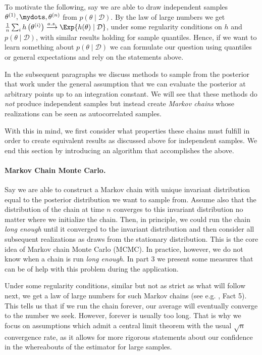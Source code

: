 To motivate the following, say we are able to draw independent samples $\theta^{(1)}, \mydots, \theta^{(n)}$ from $p(\theta \mid \mathcal{D})$.
By the law of large numbers we get $\frac{1}{n} \sum_i h\left(\theta^{(i)}\right) \overset{a.s.}{\longrightarrow} \Exp{h(\theta) \mid \mathcal{D}}$, under some regularity conditions on $h$ and $p(\theta \mid \mathcal{D})$, with similar results holding for sample quantiles.
Hence, if we want to learn something about $p(\theta \mid \mathcal{D})$ we can formulate our question using quantiles or general expectations and rely on the statements above.

In the subsequent paragraphs we discuss methods to sample from the posterior that work under the general assumption that we can evaluate the posterior at arbitrary points up to an integration constant.
We will see that these methods do \emph{not} produce independent samples but instead create \emph{Markov chains} whose realizations can be seen as autocorrelated samples.

With this in mind, we first consider what properties these chains must fulfill in order to create equivalent results as discussed above for independent samples.
We end this section by introducing an algorithm that accomplishes the above.

\paragraph{Markov Chain Monte Carlo.}
Say we are able to construct a Markov chain with unique invariant distribution equal to the posterior distribution we want to sample from.
Assume also that the distribution of the chain at time $n$ converges to this invariant distribution no matter where we initialize the chain.
Then, in principle, we could run the chain \emph{long enough} until it converged to the invariant distribution and then consider all subsequent realizations as draws from the stationary distribution.
This is the core idea of Markov chain Monte Carlo (MCMC).
In practice, however, we do not know when a chain is run \emph{long enough}.
In part 3 we present some measures that can be of help with this problem during the application.

Under some regularity conditions, similar but not as strict as what will follow next, we get a law of large numbers for such Markov chains (see e.g. \citet{roberts2004}, Fact 5).
This tells us that if we run the chain forever, our average will eventually converge to the number we seek.
However, forever is usually too long.
That is why we focus on assumptions which admit a central limit theorem with the usual $\sqrt{n}$ convergence rate, as it allows for more rigorous statements about our confidence in the whereabouts of the estimator for large samples.

